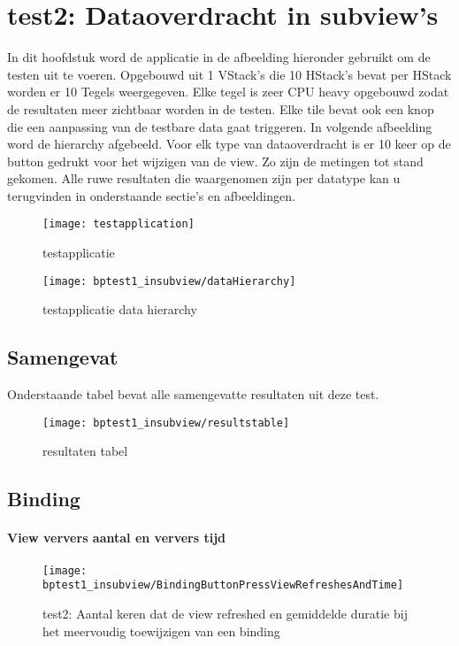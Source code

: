 \section{test2: Dataoverdracht in subview's}
In dit hoofdstuk word de applicatie in de afbeelding hieronder gebruikt om de testen uit te voeren. Opgebouwd uit 1 VStack's die 10 HStack's bevat per HStack worden er 10 Tegels weergegeven. Elke tegel is zeer CPU heavy opgebouwd zodat de resultaten meer zichtbaar worden in de testen. Elke tile bevat ook een knop die een aanpassing van de testbare data gaat triggeren. In volgende afbeelding word de hierarchy afgebeeld. Voor elk type van dataoverdracht is er 10 keer op de button gedrukt voor het wijzigen van de view. Zo zijn de metingen tot stand gekomen. Alle ruwe resultaten die waargenomen zijn per datatype kan u terugvinden in onderstaande sectie's en afbeeldingen. 
\begin{figure}[htbp]
    \centering
    \texttt{[image: testapplication]} 
    \caption{testapplicatie}
    \label{fig:testapplication}
\end{figure}
\begin{figure}[htbp]
    \centering
    \texttt{[image: bptest1\_insubview/dataHierarchy]} 
    \caption{testapplicatie data hierarchy}
    \label{fig:testapplicationHierarchy}
\end{figure}
\subsection{Samengevat}
Onderstaande tabel bevat alle samengevatte resultaten uit deze test.
\begin{figure}[H]
    \centering
    \texttt{[image: bptest1\_insubview/resultstable]} 
    \caption{resultaten tabel}
    \label{fig:resultatentabel1}
\end{figure}
\subsection{Binding}
\paragraph{View ververs aantal en ververs tijd }
\begin{figure}[H]
    \centering
    \texttt{[image: bptest1\_insubview/BindingButtonPressViewRefreshesAndTime]} 
    \caption{test2: Aantal keren dat de view refreshed en gemiddelde duratie bij het meervoudig toewijzigen van een binding}
    \label{fig:viewRefreshesBinding1}
\end{figure}
